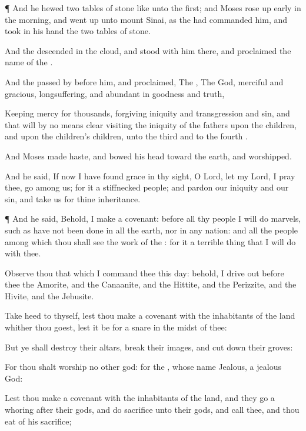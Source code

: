 {\par }{\PP {}¶ And he
hewed
two
tables of
stone like unto the
first; and
Moses rose up
early in the
morning, and went
up unto
mount
Sinai, as the
{} had
commanded him, and
took in his
hand the
two
tables of
stone.


\par }{\PP {}And the
{}
descended in the
cloud, and
stood with him there, and
proclaimed the
name of the
{}.

And the
{} passed
by before
him, and
proclaimed, The
{}, The
{}
God,
merciful and
gracious,
longsuffering, and
abundant in
goodness and
truth,

Keeping
mercy for
thousands,
forgiving
iniquity and
transgression and
sin, and that will by no
means
clear
{}
visiting the
iniquity of the
fathers upon the
children, and upon the
children’s children, unto the
third and to the
fourth
{}.

And
Moses made
haste, and bowed his
head toward the
earth, and
worshipped.

And he
said, If now I have
found
grace in thy
sight, O
Lord, let my
Lord, I pray thee,
go
among us; for it
{} a
stiffnecked
people; and
pardon our
iniquity and our
sin, and take us for thine
inheritance.


\par }{\PP {}¶ And he
said, Behold, I
make a
covenant: before all thy
people I will
do
marvels, such as have not been
done in all the
earth, nor in any
nation: and all the
people
among which thou
{} shall
see the
work of the
{}: for it
{} a terrible
thing that I will
do with thee.

Observe thou that which I
command thee this
day: behold, I drive
out
before thee the
Amorite, and the
Canaanite, and the
Hittite, and the
Perizzite, and the
Hivite, and the
Jebusite.

Take
heed to thyself, lest thou
make a
covenant with the
inhabitants of the
land whither thou
goest, lest it be for a
snare in the
midst of thee:

But ye shall
destroy their
altars,
break their
images, and cut
down their
groves:

For thou shalt
worship no
other
god: for the
{}, whose
name
{}
Jealous,
{} a
jealous
God:

Lest thou
make a
covenant with the
inhabitants of the
land, and they go a
whoring
after their
gods, and do
sacrifice unto their
gods, and
{}
call thee, and thou
eat of his
sacrifice;

}
